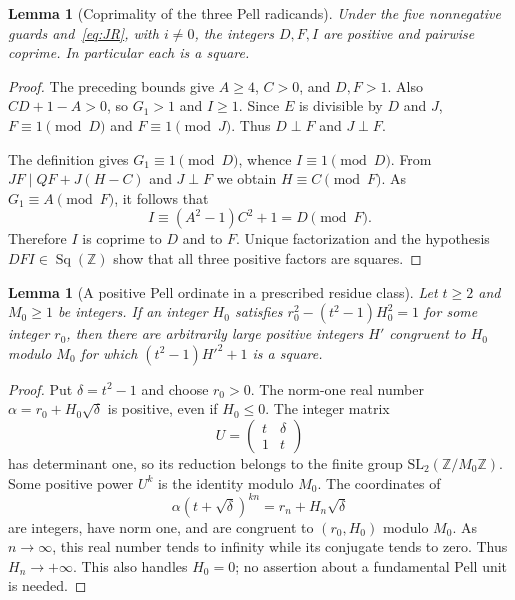 \documentclass[11pt]{article}
\newtheorem{lemma}[theorem]{Lemma}
\theoremstyle{definition}\newtheorem{definition}[theorem]{Definition}
\newcommand{\Z}{\mathbb Z}\newcommand{\N}{\mathbb N}\newcommand{\Q}{\mathbb Q}
\newcommand{\Sq}{\operatorname{Sq}(\Z)}
\begin{document}
\begin{lemma}[Coprimality of the three Pell radicands]\label{lem:coprime}
Under the five nonnegative guards and~\eqref{eq:JR}, with $i\ne0$, the integers $D,F,I$ are positive and pairwise coprime. In particular each is a square.
\end{lemma}
\begin{proof}
The preceding bounds give $A\ge4$, $C>0$, and $D,F>1$.
Also $CD+1-A>0$, so $G_1>1$ and $I\ge1$. Since $E$ is divisible by $D$ and $J$, $F\equiv1\pmod D$ and $F\equiv1\pmod J$. Thus $D\perp F$ and $J\perp F$.

The definition gives $G_1\equiv1\pmod D$, whence $I\equiv1\pmod D$. From $JF\mid QF+J(H-C)$ and $J\perp F$ we obtain $H\equiv C\pmod F$. As $G_1\equiv A\pmod F$, it follows that
\[
 I\equiv(A^2-1)C^2+1=D\pmod F.
\]
Therefore $I$ is coprime to $D$ and to $F$. Unique factorization and the hypothesis $DFI\in\Sq$ show that all three positive factors are squares.
\end{proof}

\begin{lemma}[A positive Pell ordinate in a prescribed residue class]\label{lem:orbit}
Let $t\ge2$ and $M_0\ge1$ be integers. If an integer $H_0$ satisfies
$r_0^2-(t^2-1)H_0^2=1$ for some integer $r_0$, then there are arbitrarily large positive integers $H'$ congruent to $H_0$ modulo $M_0$ for which $(t^2-1)H'^2+1$ is a square.
\end{lemma}
\begin{proof}
Put $\delta=t^2-1$ and choose $r_0>0$. The norm-one real number
$\alpha=r_0+H_0\sqrt\delta$ is positive, even if $H_0\le0$.
The integer matrix
\[
 U=\begin{pmatrix}t&\delta\\1&t\end{pmatrix}
\]
has determinant one, so its reduction belongs to the finite group
$\mathrm{SL}_2(\Z/M_0\Z)$. Some positive power $U^k$ is the identity modulo $M_0$. The coordinates of
\[
 \alpha(t+\sqrt\delta)^{kn}=r_n+H_n\sqrt\delta
\]
are integers, have norm one, and are congruent to $(r_0,H_0)$ modulo $M_0$.
As $n\to\infty$, this real number tends to infinity while its conjugate tends to zero. Thus $H_n\to+\infty$. This also handles $H_0=0$; no assertion about a fundamental Pell unit is needed.
\end{proof}
\end{document}
